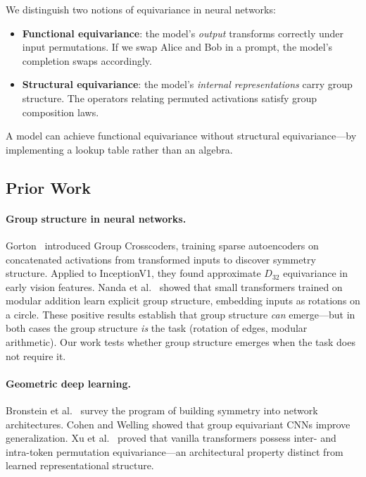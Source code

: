 \documentclass[10pt, letterpaper]{article}
\begin{document}
We distinguish two notions of equivariance in neural networks:
\begin{itemize}[itemsep=2pt]
    \item \textbf{Functional equivariance}: the model's \emph{output} transforms correctly under input permutations. If we swap Alice and Bob in a prompt, the model's completion swaps accordingly.
    \item \textbf{Structural equivariance}: the model's \emph{internal representations} carry group structure. The operators relating permuted activations satisfy group composition laws.
\end{itemize}
A model can achieve functional equivariance without structural equivariance---by implementing a lookup table rather than an algebra.

\subsection{Prior Work}

\paragraph{Group structure in neural networks.} Gorton\ \cite{gorton2024group} introduced Group Crosscoders, training sparse autoencoders on concatenated activations from transformed inputs to discover symmetry structure. Applied to InceptionV1, they found approximate $D_{32}$ equivariance in early vision features. Nanda et al.\ \cite{nanda2023grokking} showed that small transformers trained on modular addition learn explicit group structure, embedding inputs as rotations on a circle. These positive results establish that group structure \emph{can} emerge---but in both cases the group structure \emph{is} the task (rotation of edges, modular arithmetic). Our work tests whether group structure emerges when the task does not require it.

\paragraph{Geometric deep learning.} Bronstein et al.\ \cite{bronstein2021geometric} survey the program of building symmetry into network architectures. Cohen and Welling \cite{cohen2016group} showed that group equivariant CNNs improve generalization. Xu et al.\ \cite{xu2024permutation} proved that vanilla transformers possess inter- and intra-token permutation equivariance---an architectural property distinct from learned representational structure.
\end{document}
